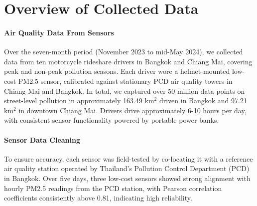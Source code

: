 \section{Overview of Collected Data}
\label{sec:result-overview-data}

\paragraph{Air Quality Data From Sensors}
Over the seven-month period (November 2023 to mid-May 2024), we collected data from ten motorcycle rideshare drivers in Bangkok and Chiang Mai, covering peak and non-peak pollution seasons.
Each driver wore a helmet-mounted low-cost PM2.5 sensor, calibrated against stationary PCD air quality towers in Chiang Mai and Bangkok.
In total, we captured over 50 million data points on street-level pollution in approximately 163.49 km$^2$ driven in Bangkok and 97.21 km$^2$ in downtown Chiang Mai.
Drivers drive approximately 6-10 hours per day, with consistent sensor functionality powered by portable power banks.



\paragraph{Sensor Data Cleaning}
To ensure accuracy, each sensor was field-tested by co-locating it with a reference air quality station operated by Thailand’s Pollution Control Department (PCD) in Bangkok.
Over five days, three low-cost sensors showed strong alignment with hourly PM2.5 readings from the PCD station, with Pearson correlation coefficients consistently above 0.81, indicating high reliability.




